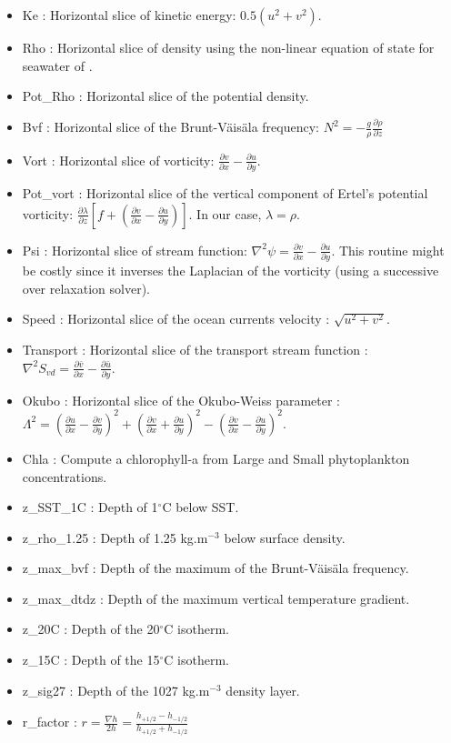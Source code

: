\begin{itemize}
\item Ke : Horizontal slice of kinetic energy: $0.5(u^2+v^2)$.
\item Rho : Horizontal slice of density using the non-linear equation of state 
for seawater of \citet{Jac95}.
\item Pot\_Rho : Horizontal slice of the potential density.
\item Bvf : Horizontal slice of the Brunt-V\"ais\"ala frequency: 
$N^2=-\frac{g}{\rho}\frac{\partial \rho}{\partial z}$ 
\item Vort : Horizontal slice of vorticity: $\frac{\partial v}{\partial x}-
\frac{\partial u}{\partial y}$.
\item Pot\_vort : Horizontal slice of the vertical component of Ertel's potential vorticity:
$\frac{\partial \lambda}{\partial z} \left [ f + 
\left (\frac{\partial v}{\partial x}-\frac{\partial u}{\partial y}\right ) \right ]$.
In our case, $\lambda=\rho$.
\item Psi : Horizontal slice of stream function: 
$\nabla^2 \psi=\frac{\partial v}{\partial x}-\frac{\partial u}{\partial y}$.
This routine might be costly since it inverses the Laplacian of the vorticity
(using a successive over relaxation solver).
\item Speed : Horizontal slice of the ocean currents velocity : $\sqrt{u^2+v^2}$.
\item Transport : Horizontal slice of the transport stream function : 
$\nabla^2 S_{vd}=\frac{\partial \bar{v}}{\partial x}-\frac{\partial \bar{u}}{\partial y}$.
\item Okubo : Horizontal slice of the Okubo-Weiss parameter : 
$\Lambda^2=
\left ( \frac{\partial u}{\partial x}-\frac{\partial v}{\partial y} \right )^2+
\left ( \frac{\partial v}{\partial x}+\frac{\partial u}{\partial y} \right )^2-
\left ( \frac{\partial v}{\partial x}-\frac{\partial u}{\partial y} \right )^2$.
\item Chla : Compute a chlorophyll-a from Large and Small phytoplankton concentrations.
\item z\_SST\_1C : Depth of 1$^\circ$C below SST.
\item z\_rho\_1.25 : Depth of 1.25 kg.m$^{-3}$ below surface density.
\item z\_max\_bvf : Depth of the maximum of the  Brunt-V\"ais\"ala frequency.
\item z\_max\_dtdz : Depth of the maximum  vertical temperature gradient.
\item z\_20C : Depth of the 20$^\circ$C isotherm.
\item z\_15C : Depth of the 15$^\circ$C isotherm.
\item z\_sig27 : Depth of the 1027 kg.m$^{-3}$ density layer.
\item r\_factor : $r=\frac{\nabla h}{2h}=\frac{h_{+1/2}-h_{-1/2}}{h_{+1/2}+h_{-1/2}}$
\end{itemize}

